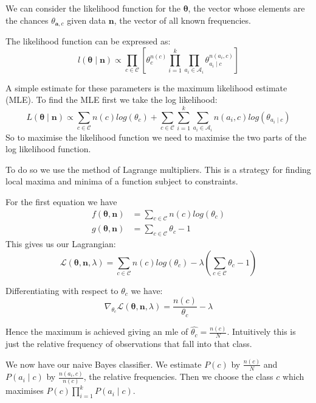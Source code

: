 We can consider the likelihood function for the $\mathbf{\theta}$, the vector whose elements are the chances $\theta_{\mathbf{a}, c}$ given data $\mathbf{n}$, the vector of all known frequencies.

The likelihood function can be expressed as:
\begin{equation} \label{likelihood}
	l(\mathbf{\theta} \mid \mathbf{n}) \propto \prod_{c \in \mathcal{C}} \left[ \theta_c^{n(c)} \prod_{i=1}^k \prod_{a_i \in \mathcal{A}_i} \theta_{a_i \mid c}^{n(a_i, c)} \right]
\end{equation}

A simple estimate for these parameters is the maximum likelihood estimate (MLE). To find the MLE first we take the log likelihood:
\begin{equation}
	L(\mathbf{\theta} \mid \mathbf{n}) \propto \sum_{c \in \mathcal{C}}  n(c)log(\theta_c) + \sum_{c \in \mathcal{C}} \sum_{i=1}^k \sum_{a_i \in \mathcal{A}_i} n(a_i, c) log(\theta_{a_i \mid c}) 
\end{equation}
So to maximise the likelihood function we need to maximise the two parts of the log likelihood function.

To do so we use the method of Lagrange multipliers. This is a strategy for finding local maxima and minima of a function subject to constraints.

For the first equation we have
\begin{align}
	f(\mathbf{\theta}, \mathbf{n})& = \sum_{c \in \mathcal{C}}  n(c)log(\theta_c) \\
	g(\mathbf{\theta}, \mathbf{n})& = \sum_{c \in \mathcal{C}}  \theta_c - 1
\end{align}
This gives us our Lagrangian:
\begin{equation}
	\mathcal{L}(\mathbf{\theta}, \mathbf{n}, \lambda) = \sum_{c \in \mathcal{C}}  n(c)log(\theta_c) - \lambda(\sum_{c \in \mathcal{C}}  \theta_c - 1)
\end{equation}

Differentiating with respect to $\theta_c$ we have:
\begin{equation}
	\nabla_{\theta_c} \mathcal{L}(\mathbf{\theta}, \mathbf{n}, \lambda) = \frac{n(c)}{\theta_c} - \lambda
\end{equation}

Hence the maximum is achieved giving an mle of $\hat{\theta_c} = \frac{n(c)}{N}$. Intuitively this is just the relative frequency of observations that fall into that class.

We now have our naive Bayes classifier. We estimate $P(c)$ by $\frac{n(c)}{N}$ and $P(a_i \mid c)$ by $\frac{n(a_i, c)}{n(c)}$, the relative frequencies. Then we choose the class $c$ which maximises $P(c)\prod_{i=1}^{k}P(a_i \mid c)$.

